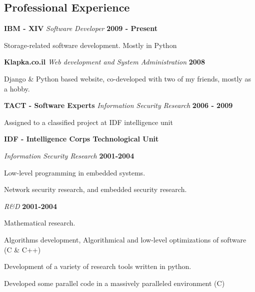 \documentclass[margin,line]{res}
\newenvironment{list1}{
  \begin{list}{\ding{113}}{%
      \setlength{\itemsep}{0in}
      \setlength{\parsep}{0in} \setlength{\parskip}{0in}
      \setlength{\topsep}{0in} \setlength{\partopsep}{0in} 
      \setlength{\leftmargin}{0.2in}}}{\end{list}}
\begin{document}
\begin{resume}
\section{\sc Professional Experience}
{\bf IBM - XIV}
{\em Software Developer} \hfill {\bf 2009 - Present} 
\begin{list1}
\item[] Storage-related software development. Mostly in Python
\end{list1}

{\bf Klapka.co.il}
{\em Web development and System Administration} \hfill {\bf 2008} 
\begin{list1}
\item[] Django \& Python based website, co-developed with two of my friends, mostly as a hobby.
\end{list1}

{\bf TACT - Software Experts}
{\em Information Security Research} \hfill {\bf 2006 - 2009}
\begin{list1}
\item[] Assigned to a classified project at IDF intelligence unit
\end{list1}

{\bf IDF - Intelligence Corps Technological Unit}

{\em Information Security Research} \hfill {\bf 2001-2004}
\begin{list1}
\item[] Low-level programming in embedded systems.
\item[] Network security research, and embedded security research.
\end{list1}

{\em R\&D} \hfill {\bf 2001-2004}
\begin{list1}
\item[] Mathematical research.
\item[] Algorithms development, Algorithmical and low-level optimizations of software (C \& C++)
\item[] Development of a variety of research tools written in python.
\item[] Developed some parallel code in a massively paralleled environment (C)
\end{list1}


\end{resume}
\end{document}
